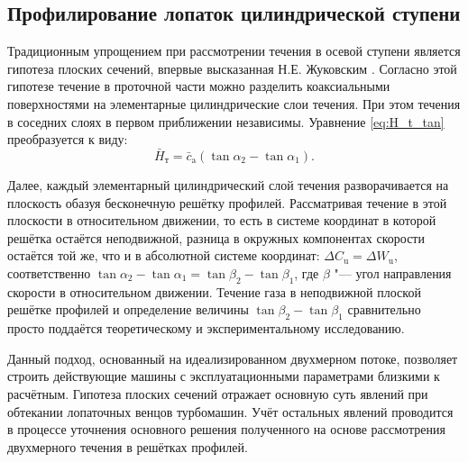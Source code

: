\subsection{Профилирование лопаток цилиндрической ступени}\label{sec:ch1/profil}

 Традиционным упрощением при рассмотрении течения в осевой ступени является гипотеза плоских сечений, впервые высказанная Н.Е. Жуковским \cite{Joukovskiy1949}. Согласно этой гипотезе течение в проточной части можно разделить коаксиальными поверхностями на элементарные цилиндрические слои течения. При этом течения в соседних слоях в первом приближении независимы. Уравнение \ref{eq:H_t_tan} преобразуется к виду:
\begin{equation}
	\bar{H}_\text{т} = \bar{c}_\text{a} \left( \tan\alpha_2 - \tan\alpha_1 \right).
	\label{eq:H_t_cil}
\end{equation}

Далее, каждый элементарный цилиндрический слой течения разворачивается на плоскость обазуя бесконечную решётку профилей. Рассматривая течение в этой плоскости в относительном движении, то есть в системе координат в которой решётка остаётся неподвижной, разница в окружных компонентах скорости остаётся той же, что и в абсолютной системе координат: \(\Delta C_\text{u} = \Delta W_\text{u}\), соответственно \(\tan\alpha_2 - \tan\alpha_1 = \tan\beta_2 - \tan\beta_1\), где \(\beta\) "--- угол направления скорости в относительном движении. Течение газа в неподвижной плоской решётке профилей и определение величины \(\tan\beta_2 - \tan\beta_1\) сравнительно просто поддаётся теоретическому и экспериментальному исследованию. 

Данный подход, основанный на идеализированном двухмерном потоке, позволяет строить действующие машины с эксплуатационными параметрами близкими к расчётным. Гипотеза плоских сечений отражает основную суть явлений при обтекании лопаточных венцов турбомашин. Учёт остальных явлений проводится в процессе уточнения основного решения полученного на основе рассмотрения двухмерного течения в решётках профилей.

